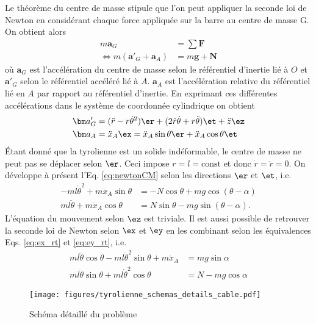 Le théorème du centre de masse stipule que l'on peut appliquer la seconde loi de Newton en considérant chaque force appliquée sur la barre au centre de masse G.
On obtient alors 
\begin{align}
    m \bm a_G &= \sum \bm F \nonumber\\
    \Leftrightarrow m (\bm a'_G + \bm a_A) &= m\bm g + \bm N \label{eq:newtonCM}
\end{align}
o\`u $\bm a_G$ est l'accélération du centre de masse selon le référentiel d'inertie lié à $O$ et $\bm a'_G$ selon le référentiel accéléré lié à $A$. $\bm a_A$ est l'accélération relative du référentiel lié en $A$ par rapport au référentiel d'inertie.
En exprimant ces différentes accélérations dans le système de coordonnée cylindrique on obtient
\begin{align}
    \bm a'_G &= (\ddot r - r\dot\theta^2)\er + (2\dot r \dot \theta + r \ddot \theta) \et  + \ddot z \ez \\
    \bm a_A &=\ddot x_A\ex= \ddot x_A \sin\theta \er + \ddot x_A \cos\theta \et
\end{align}
Étant donné que la tyrolienne est un solide indéformable, le centre de masse ne peut pas se déplacer selon $\er$. Ceci impose $r=l=\textrm{const}$ et donc $\dot r = \ddot r =0$.
On développe à présent l'Eq. \eqref{eq:newtonCM} selon les directions $\er$ et $\et$, i.e.
\begin{align}
    -ml\dot\theta^2 + m\ddot x_A\sin\theta &= -N\cos\theta + mg\cos(\theta-\alpha) \label{eq:NewtonCM_er}\\
    ml\ddot\theta + m\ddot x_A\cos\theta &= N\sin\theta - mg\sin(\theta-\alpha)\label{eq:NewtonCM_et}.
\end{align}
L'équation du mouvement selon $\ez$ est triviale.
Il est aussi possible de retrouver la seconde loi de Newton selon $\ex$ et $\ey$ en les combinant selon les équivalences Eqs. \eqref{eq:ex_rt} et \eqref{eq:ey_rt}, i.e.
\begin{align}
ml\ddot\theta\cos\theta - ml\dot\theta^2 \sin\theta  + m\ddot x_A &= m g \sin\alpha\label{eq:newton_ex}\\
ml\ddot\theta\sin\theta +ml \dot\theta^2\cos\theta &= N - mg\cos\alpha \label{eq:newton_ey}
\end{align}

 \begin{figure}
     \centering
     \texttt{[image: figures/tyrolienne\_schemas\_details\_cable.pdf]}
     \caption{Schéma détaillé du problème}
     \label{fig:schema_details}
 \end{figure}
